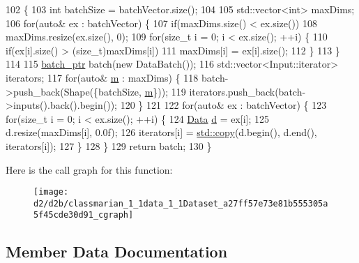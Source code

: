 \begin{DoxyCode}
102                                                  \{
103     \textcolor{keywordtype}{int} batchSize = batchVector.size();
104 
105     std::vector<int> maxDims;
106     \textcolor{keywordflow}{for}(\textcolor{keyword}{auto}& ex : batchVector) \{
107       \textcolor{keywordflow}{if}(maxDims.size() < ex.size())
108         maxDims.resize(ex.size(), 0);
109       \textcolor{keywordflow}{for}(\textcolor{keywordtype}{size\_t} i = 0; i < ex.size(); ++i) \{
110         \textcolor{keywordflow}{if}(ex[i].size() > (size\_t)maxDims[i])
111           maxDims[i] = ex[i].size();
112       \}
113     \}
114 
115     \hyperlink{classmarian_1_1data_1_1DatasetBase_a4cb5e9051a072fcc61ed4638862f01f5}{batch\_ptr} batch(\textcolor{keyword}{new} DataBatch());
116     std::vector<Input::iterator> iterators;
117     \textcolor{keywordflow}{for}(\textcolor{keyword}{auto}& \hyperlink{namespacefix__hard_aeddecc2eb0c9f49a568cb1bf69ac50f5}{m} : maxDims) \{
118       batch->push\_back(Shape(\{batchSize, \hyperlink{namespacefix__hard_aeddecc2eb0c9f49a568cb1bf69ac50f5}{m}\}));
119       iterators.push\_back(batch->inputs().back().begin());
120     \}
121 
122     \textcolor{keywordflow}{for}(\textcolor{keyword}{auto}& ex : batchVector) \{
123       \textcolor{keywordflow}{for}(\textcolor{keywordtype}{size\_t} i = 0; i < ex.size(); ++i) \{
124         \hyperlink{namespacemarian_1_1data_a5801e80ecb76ee38a5ac080f08d9646c}{Data} \hyperlink{namespacefix__hard_aabe341c29efe998cc0ae0776d9e87043}{d} = ex[i];
125         d.resize(maxDims[i], 0.0f);
126         iterators[i] = \hyperlink{namespaceamunmt_1_1GPU_1_1mblas_a6531a040aa422fcd149f89b92f6d2585}{std::copy}(d.begin(), d.end(), iterators[i]);
127       \}
128     \}
129     \textcolor{keywordflow}{return} batch;
130   \}
\end{DoxyCode}


Here is the call graph for this function\+:
\nopagebreak
\begin{figure}[H]
\begin{center}
\leavevmode
\texttt{[image: d2/d2b/classmarian\_1\_1data\_1\_1Dataset\_a27ff57e73e81b555305a5f45cde30d91\_cgraph]}
\end{center}
\end{figure}




\subsection{Member Data Documentation}
